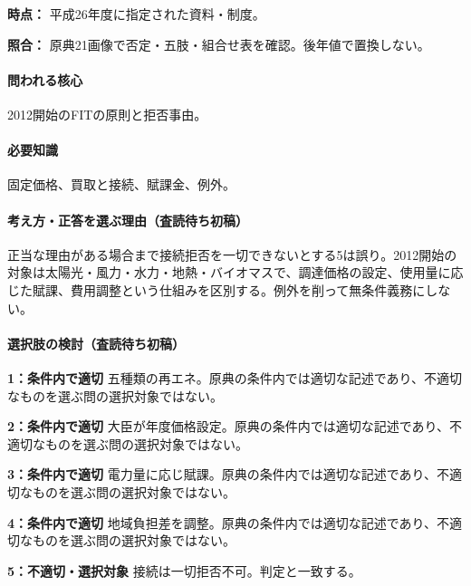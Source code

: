 \noindent\textbf{時点：} 平成26年度に指定された資料・制度。\par

\noindent\textbf{照合：} 原典21画像で否定・五肢・組合せ表を確認。後年値で置換しない。\par

\paragraph{問われる核心} 2012開始のFITの原則と拒否事由。

\paragraph{必要知識} 固定価格、買取と接続、賦課金、例外。

\paragraph{考え方・正答を選ぶ理由（査読待ち初稿）} 正当な理由がある場合まで接続拒否を一切できないとする5は誤り。2012開始の対象は太陽光・風力・水力・地熱・バイオマスで、調達価格の設定、使用量に応じた賦課、費用調整という仕組みを区別する。例外を削って無条件義務にしない。

\paragraph{選択肢の検討（査読待ち初稿）}\mbox{}\par

\noindent\textbf{1：条件内で適切} 五種類の再エネ。原典の条件内では適切な記述であり、不適切なものを選ぶ問の選択対象ではない。\par

\noindent\textbf{2：条件内で適切} 大臣が年度価格設定。原典の条件内では適切な記述であり、不適切なものを選ぶ問の選択対象ではない。\par

\noindent\textbf{3：条件内で適切} 電力量に応じ賦課。原典の条件内では適切な記述であり、不適切なものを選ぶ問の選択対象ではない。\par

\noindent\textbf{4：条件内で適切} 地域負担差を調整。原典の条件内では適切な記述であり、不適切なものを選ぶ問の選択対象ではない。\par

\noindent\textbf{5：不適切・選択対象} 接続は一切拒否不可。判定と一致する。\par

